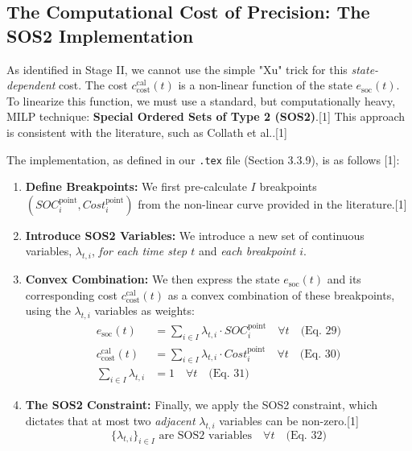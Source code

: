 \documentclass[11pt, a4paper]{article}
\begin{document}
\subsection{The Computational Cost of Precision: The SOS2 Implementation}

As identified in Stage II, we cannot use the simple "Xu" trick for this \textit{state-dependent} cost. The cost $c^{\mathrm{cal}}_{\mathrm{cost}}(t)$ is a non-linear function of the state $e_{\mathrm{soc}}(t)$. To linearize this function, we must use a standard, but computationally heavy, MILP technique: \textbf{Special Ordered Sets of Type 2 (SOS2)}.[1] This approach is consistent with the literature, such as Collath et al..[1]

The implementation, as defined in our \texttt{.tex} file (Section 3.3.9), is as follows [1]:

\begin{enumerate}
    \item \textbf{Define Breakpoints:} We first pre-calculate $I$ breakpoints $(SOC^{\mathrm{point}}_i, Cost^{\mathrm{point}}_i)$ from the non-linear curve provided in the literature.[1]
    \item \textbf{Introduce SOS2 Variables:} We introduce a new set of continuous variables, $\lambda_{t,i}$, \textit{for each time step $t$} and \textit{each breakpoint $i$}.
    \item \textbf{Convex Combination:} We then express the state $e_{\mathrm{soc}}(t)$ and its corresponding cost $c^{\mathrm{cal}}_{\mathrm{cost}}(t)$ as a convex combination of these breakpoints, using the $\lambda_{t,i}$ variables as weights:
    \begin{align}
        e_{\mathrm{soc}}(t) &= \sum_{i \in I} \lambda_{t,i} \cdot SOC^{\mathrm{point}}_i \quad \forall t \quad \text{(Eq. 29)} \\
        c^{\mathrm{cal}}_{\mathrm{cost}}(t) &= \sum_{i \in I} \lambda_{t,i} \cdot Cost^{\mathrm{point}}_i \quad \forall t \quad \text{(Eq. 30)} \\
        \sum_{i \in I} \lambda_{t,i} &= 1 \quad \forall t \quad \text{(Eq. 31)}
    \end{align}
    \item \textbf{The SOS2 Constraint:} Finally, we apply the SOS2 constraint, which dictates that at most two \textit{adjacent} $\lambda_{t,i}$ variables can be non-zero.[1]
    \begin{equation}
        \{\lambda_{t,i}\}_{i \in I} \text{ are SOS2 variables} \quad \forall t \quad \text{(Eq. 32)}
    \end{equation}
\end{enumerate}
\end{document}
